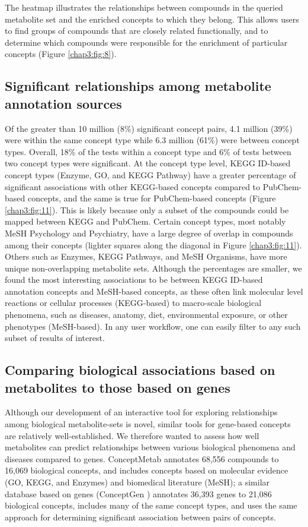 The heatmap illustrates the relationships between compounds in the queried metabolite set and the enriched concepts to which they belong. This allows users to find groups of compounds that are closely related functionally, and to determine which compounds were responsible for the enrichment of particular concepts (Figure \ref{chap3:fig:8}).

\subsection{Significant relationships among metabolite annotation sources}
\label{conceptmetab_results_sigrelationships}

Of the greater than 10 million (8\%) significant concept pairs, 4.1 million (39\%) were within the same concept type while 6.3 million (61\%) were between concept types. Overall, 18\% of the tests within a concept type and 6\% of tests between two concept types were significant. At the concept type level, KEGG ID-based concept types (Enzyme, GO, and KEGG Pathway) have a greater percentage of significant associations with other KEGG-based concepts compared to PubChem-based concepts, and the same is true for PubChem-based concepts (Figure \ref{chap3:fig:11}). This is likely because only a subset of the compounds could be mapped between KEGG and PubChem. Certain concept types, most notably MeSH Psychology and Psychiatry, have a large degree of overlap in compounds among their concepts (lighter squares along the diagonal in Figure \ref{chap3:fig:11}). Others such as Enzymes, KEGG Pathways, and MeSH Organisms, have more unique non-overlapping metabolite sets. Although the percentages are smaller, we found the most interesting associations to be between KEGG ID-based annotation concepts and MeSH-based concepts, as these often link molecular level reactions or cellular processes (KEGG-based) to macro-scale biological phenomena, such as diseases, anatomy, diet, environmental exposure, or other phenotypes (MeSH-based). In any user workflow, one can easily filter to any such subset of results of interest.

\subsection{Comparing biological associations based on metabolites to those based on genes}
\label{conceptmetab_results_comparing}

Although our development of an interactive tool for exploring relationships among biological metabolite-sets is novel, similar tools for gene-based concepts are relatively well-established. We therefore wanted to assess how well metabolites can predict relationships between various biological phenomena and diseases compared to genes. ConceptMetab annotates 68,556 compounds to 16,069 biological concepts, and includes concepts based on molecular evidence (GO, KEGG, and Enzymes) and biomedical literature (MeSH); a similar database based on genes (ConceptGen \cite{Sartor:2009fo}) annotates 36,393 genes to 21,086 biological concepts, includes many of the same concept types, and uses the same approach for determining significant association between pairs of concepts.

